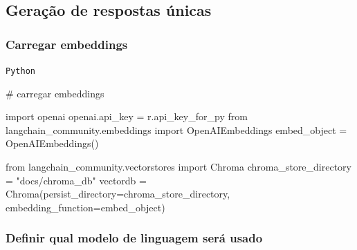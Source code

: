 \documentclass[
  letterpaper,
  DIV=11,
  numbers=noendperiod]{scrartcl}
\newenvironment{Shaded}{\begin{snugshade}}{\end{snugshade}}
\newcommand{\CommentTok}[1]{\textcolor[rgb]{0.37,0.37,0.37}{#1}}
\newcommand{\ImportTok}[1]{\textcolor[rgb]{0.00,0.46,0.62}{#1}}
\newcommand{\NormalTok}[1]{\textcolor[rgb]{0.00,0.23,0.31}{#1}}
\newcommand{\OperatorTok}[1]{\textcolor[rgb]{0.37,0.37,0.37}{#1}}
\newcommand{\StringTok}[1]{\textcolor[rgb]{0.13,0.47,0.30}{#1}}
\begin{document}
\hypertarget{gerauxe7uxe3o-de-respostas-uxfanicas}{%
\subsection{Geração de respostas
únicas}\label{gerauxe7uxe3o-de-respostas-uxfanicas}}

\hypertarget{carregar-embeddings}{%
\subsubsection{Carregar embeddings}\label{carregar-embeddings}}

\begin{codelisting}

\caption{\texttt{Python}}

\begin{Shaded}
\begin{Highlighting}[]
\CommentTok{\# carregar embeddings}

\ImportTok{import}\NormalTok{ openai}
\NormalTok{openai.api\_key }\OperatorTok{=}\NormalTok{ r.api\_key\_for\_py  }
\ImportTok{from}\NormalTok{ langchain\_community.embeddings }\ImportTok{import}\NormalTok{ OpenAIEmbeddings}
\NormalTok{embed\_object }\OperatorTok{=}\NormalTok{ OpenAIEmbeddings()}

\ImportTok{from}\NormalTok{ langchain\_community.vectorstores }\ImportTok{import}\NormalTok{ Chroma}
\NormalTok{chroma\_store\_directory }\OperatorTok{=} \StringTok{"docs/chroma\_db"}
\NormalTok{vectordb }\OperatorTok{=}\NormalTok{ Chroma(persist\_directory}\OperatorTok{=}\NormalTok{chroma\_store\_directory, }
\NormalTok{                  embedding\_function}\OperatorTok{=}\NormalTok{embed\_object)}
\end{Highlighting}
\end{Shaded}

\end{codelisting}

\hypertarget{definir-qual-modelo-de-linguagem-seruxe1-usado}{%
\subsubsection{Definir qual modelo de linguagem será
usado}\label{definir-qual-modelo-de-linguagem-seruxe1-usado}}
\end{document}
